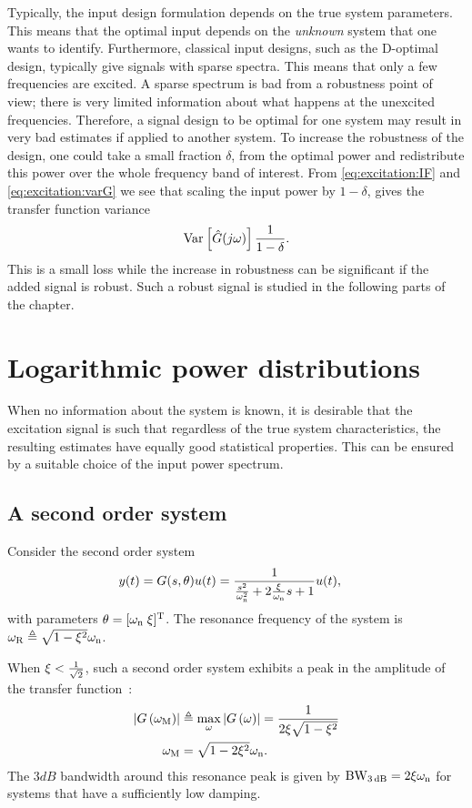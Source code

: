 Typically, the input design formulation depends on the true system parameters. This means that the optimal input depends on the \emph{unknown} system that one wants to identify. 
Furthermore, classical input designs, such as the D-optimal design, typically give signals with sparse spectra. 
This means that only a few frequencies are excited. 
A sparse spectrum is bad from a robustness point of view; there is very limited information about what happens at the unexcited frequencies. 
Therefore, a signal design to be optimal for one system may result in very bad estimates if applied to another system.
To increase the robustness of the design, one could take a small fraction $\delta$, from the optimal power and redistribute this power over the whole frequency band of interest.
From \eqref{eq:excitation:IF} and \eqref{eq:excitation:varG} we see that scaling the input power by $1-\delta$, gives the transfer function variance
\begin{align}
\operatorname{\mathrm{Var}}_{} \left[ \hat{G}(j\omega) \right]\frac{1}{1-\delta}.
\end{align}
This is a small loss while the increase in robustness can be significant if the added signal is robust. Such a robust signal is studied in the following parts of the chapter.

\section{Logarithmic power distributions}
\label{sec:excitation:logarithmic}
When no information about the system is known, it is desirable that the excitation signal is such that regardless of the true system characteristics, the resulting estimates have equally good statistical properties.
This can be ensured by a suitable choice of the input power spectrum.

 \subsection{A second order system}
Consider the second order system
\begin{align}
y(t) 
  &= 
  G(s,\theta) u(t) 
  = \frac{1}
                {\frac{s^2}{\omega_{\mathrm{n}}^2} + 2\frac{\xi_{}}{\omega_{\mathrm{n}}}s + 1}
      u(t),
\label{eq:excitation:2ndOrderSys}
\end{align}
with parameters $\theta=[\omega_{\mathrm{n}}\;\xi_{}]^{\mathrm{T}}$. 
The resonance frequency of the system is $\omega_{\mathrm{R}} \triangleq \sqrt{1-\xi_{}^2}\omega_{\mathrm{n}}$.
  
When $\xi_{} < \frac{1}{\sqrt{2}}$, such a second order system exhibits a peak in the amplitude of the transfer function~\citep{Oppenheim1983}:
  \begin{align}
   \left| G\left(\omega_{\mathrm{M}} \right) \right| & \triangleq
          \max_{\omega} \left| G\left( \omega \right)  \right|
        = \frac{1}
               {2 \xi_{} \sqrt{1-\xi_{}^2}}
               \label{eq:excitation:peakAmplitude}\\
   \omega_{\mathrm{M}} &
        = \sqrt{1-2\xi_{}^2} \omega_{\mathrm{n}}
        \label{eq:excitation:peakFrequency}
    \text{.}
  \end{align}
  The $3\unit{dB}$ bandwidth around this resonance peak is given by $\mathrm{BW}_{3\,\mathrm{dB}} = 2\xi_{}\omega_{\mathrm{n}}$ for systems that have a sufficiently low damping.

